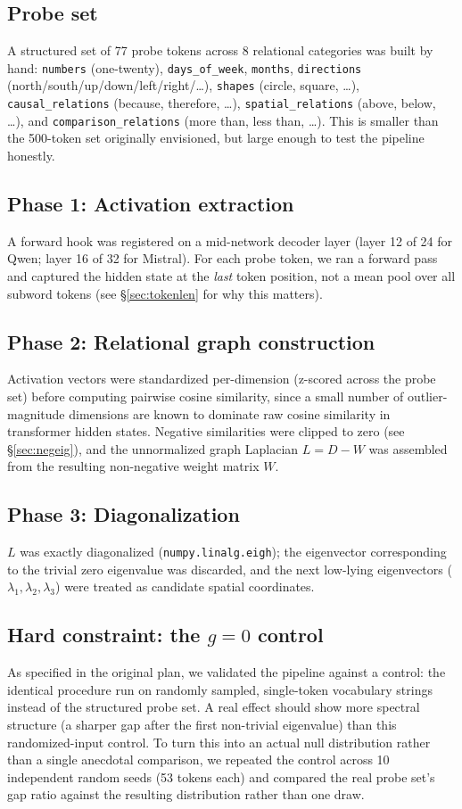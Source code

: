 \documentclass[11pt]{article}
\begin{document}
\subsection{Probe set}
A structured set of 77 probe tokens across 8 relational categories was built
by hand: \texttt{numbers} (one-twenty), \texttt{days\_of\_week},
\texttt{months}, \texttt{directions} (north/south/up/down/left/right/\ldots),
\texttt{shapes} (circle, square, \ldots), \texttt{causal\_relations}
(because, therefore, \ldots), \texttt{spatial\_relations} (above, below,
\ldots), and \texttt{comparison\_relations} (more than, less than, \ldots).
This is smaller than the 500-token set originally envisioned, but large enough
to test the pipeline honestly.

\subsection{Phase 1: Activation extraction}
A forward hook was registered on a mid-network decoder layer (layer 12 of 24
for Qwen; layer 16 of 32 for Mistral). For each probe token, we ran a forward
pass and captured the hidden state at the \emph{last} token position, not a
mean pool over all subword tokens (see \S\ref{sec:tokenlen} for why this
matters).

\subsection{Phase 2: Relational graph construction}
Activation vectors were standardized per-dimension (z-scored across the probe
set) before computing pairwise cosine similarity, since a small number of
outlier-magnitude dimensions are known to dominate raw cosine similarity in
transformer hidden states. Negative similarities were clipped to zero (see
\S\ref{sec:negeig}), and the unnormalized graph Laplacian $L = D - W$ was
assembled from the resulting non-negative weight matrix $W$.

\subsection{Phase 3: Diagonalization}
$L$ was exactly diagonalized (\texttt{numpy.linalg.eigh}); the eigenvector
corresponding to the trivial zero eigenvalue was discarded, and the next
low-lying eigenvectors ($\lambda_1, \lambda_2, \lambda_3$) were treated as
candidate spatial coordinates.

\subsection{Hard constraint: the $g{=}0$ control}
\label{sec:g0method}
As specified in the original plan, we validated the pipeline against a
control: the identical procedure run on randomly sampled, single-token
vocabulary strings instead of the structured probe set. A real effect should
show more spectral structure (a sharper gap after the first non-trivial
eigenvalue) than this randomized-input control. To turn this into an actual
null distribution rather than a single anecdotal comparison, we repeated the
control across 10 independent random seeds (53 tokens each) and compared the
real probe set's gap ratio against the resulting distribution rather than
one draw.
\end{document}
